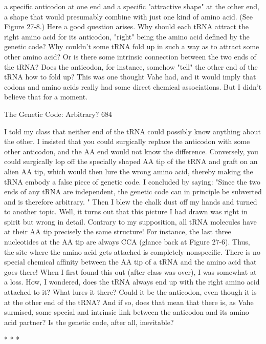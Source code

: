 a specific anticodon at one end and a specific "attractive shape" at the other end, a
shape that would presumably combine with just one kind of amino acid. (See Figure
27-8.)
        Here a good question arises. Why should each tRNA attract the right amino
acid for its anticodon, "right" being the amino acid defined by the genetic code? Why
couldn't some tRNA fold up in such a way as to attract some other amino acid? Or is
there some intrinsic connection between the two ends of the tRNA? Does the
anticodon, for instance, somehow "tell" the other end of the tRNA how to fold up?
This was one thought Vahe had, and it would imply that codons and amino acids
really had some direct chemical associations. But I didn't believe that for a moment.




The Genetic Code: Arbitrary?                                                     684

I told my class that neither end of the tRNA could possibly know anything about the
other. I insisted that you could surgically replace the anticodon with some other
anticodon, and the AA end would not know the difference. Conversely, you could
surgically lop off the specially shaped AA tip of the tRNA and graft on an alien AA
tip, which would then lure the wrong amino acid, thereby making the tRNA embody a
false piece of genetic code. I concluded by saying: "Since the two ends of any tRNA
are independent, the genetic code can in principle be subverted and is therefore
arbitrary. " Then I blew the chalk dust off my hands and turned to another topic.
        Well, it turns out that this picture I had drawn was right in spirit but wrong in
detail. Contrary to my supposition, all tRNA molecules have at their AA tip precisely
the same structure! For instance, the last three nucleotides at the AA tip are always
CCA (glance back at Figure 27-6). Thus, the site where the amino acid gets attached
is completely nonspecific. There is no special chemical affinity between the AA tip of
a tRNA and the amino acid that goes there! When I first found this out (after class
was over), I was somewhat at a loss. How, I wondered, does the tRNA always end up
with the right amino acid attached to it? What lures it there? Could it be the
anticodon, even though it is at the other end of the tRNA? And if so, does that mean
that there is, as Vahe surmised, some special and intrinsic link between the anticodon
and its amino acid partner? Is the genetic code, after all, inevitable?

                                       *   *   *

